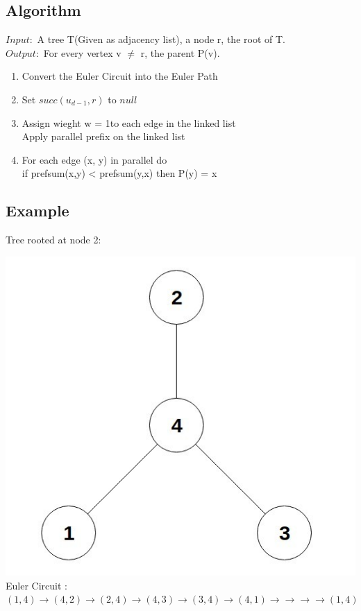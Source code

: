 \documentclass[twoside]{article}
\begin{document}
\subsection{Algorithm}
$Input: $ A tree T(Given as adjacency list), a node r, the root of T.\\
$Output: $ For every vertex v $\neq$ r, the parent P(v).\\

\begin{enumerate}
\item Convert the Euler Circuit into the Euler Path
\item Set $succ(u_{d-1}, r)$ to $null$
\item Assign wieght w = 1to each edge in the linked list\\
Apply parallel prefix on the linked list
\item For each edge (x, y) in parallel do \\
if prefsum(x,y) < prefsum(y,x) then P(y) = x
\end{enumerate}

\subsection{Example}
Tree rooted at node 2:\\
\begin{center}
\includegraphics[scale=0.25]{g2} \\
Euler Circuit : $(1,4)\to(4,2)\to(2,4)\to(4,3)\to(3,4)\to(4,1)\to\to\to\to(1,4)$
\end{center}
\end{document}
